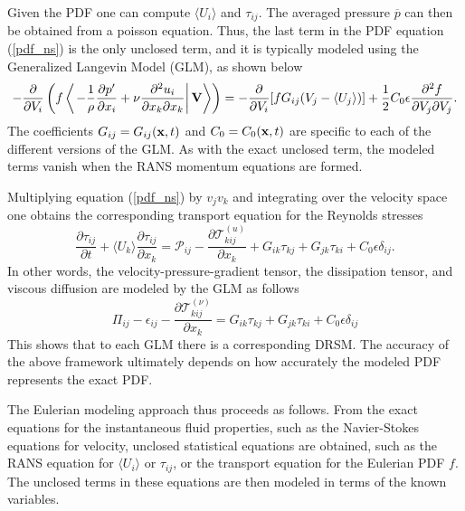 \documentclass[oneside,a4paper,11pt]{report}
\newcommand{\pavg}{\overline{p}}
\newcommand{\pfluc}{p'}
\newcommand{\rs}{\tau}          %
\newcommand{\uiavg}{\langle U_i \rangle}
\newcommand{\ujavg}{\langle U_j \rangle}
\newcommand{\ukavg}{\langle U_k \rangle}
\newcommand{\uifluc}{u_i}
\begin{document}
Given the PDF one can compute $\uiavg$ and $\rs_{ij}$. The averaged pressure $\pavg$ can then be obtained from a poisson equation. Thus, the last term in the PDF equation (\ref{pdf_ns}) is the only unclosed term, and it is typically modeled using the Generalized Langevin Model (GLM), as shown below
\begin{equation}
\label{GLM}
- \frac{\partial}{\partial V_i} \left ( f \left < \left . - \frac{1}{\rho} \frac{\partial \pfluc}{\partial x_i} +  \nu \frac{\partial^2 \uifluc}{\partial x_k \partial x_k} \right | \Vvec \right > \right ) = -\frac{\partial}{\partial V_i} [f G_{ij} (V_j - \ujavg)] + \frac{1}{2} C_0 \epsilon \frac{\partial^2 f}{\partial V_j \partial V_j}.
\end{equation}
The coefficients $G_{ij} = G_{ij}(\mathbf{x},t)$ and $C_0 = C_0(\mathbf{x},t)$ are specific to each of the different versions of the GLM. As with the exact unclosed term, the modeled terms vanish when the RANS momentum equations are formed. 

Multiplying equation (\ref{pdf_ns}) by $v_j v_k$ and integrating over the velocity space one obtains the corresponding transport equation for the Reynolds stresses
\begin{equation}
\frac{\partial \rs_{ij}}{\partial t} + \ukavg \frac{\partial \rs_{ij}}{\partial x_k} = \mathcal{P}_{ij} - \frac{\partial \mathcal{T}^{(u)}_{kij} }{\partial x_k} + G_{ik} \rs_{kj} + G_{jk} \rs_{ki} + C_0 \epsilon \delta_{ij}.
\end{equation} 
In other words, the velocity-pressure-gradient tensor, the dissipation tensor, and viscous diffusion are modeled by the GLM as follows
\begin{equation}
\Pi_{ij} - \epsilon_{ij} - \frac{\partial \mathcal{T}^{(\nu)}_{kij} }{\partial x_k} = G_{ik} \rs_{kj} + G_{jk} \rs_{ki} + C_0 \epsilon \delta_{ij}
\end{equation}
This shows that to each GLM there is a corresponding DRSM. The accuracy of the above framework ultimately depends on how accurately the modeled PDF represents the exact PDF.

The Eulerian modeling approach thus proceeds as follows. From the exact equations for the instantaneous fluid properties, such as the Navier-Stokes equations for velocity, unclosed statistical equations are obtained, such as the RANS equation for $\uiavg$ or $\rs_{ij}$, or the transport equation for the Eulerian PDF $f$. The unclosed terms in these equations are then modeled in terms of the known variables.

\end{document}
